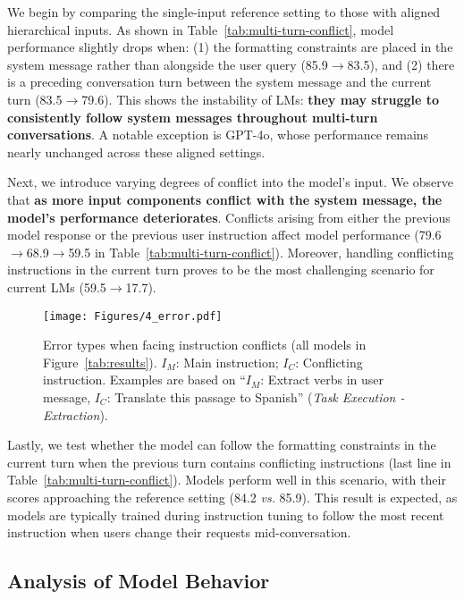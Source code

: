 We begin by comparing the single-input reference setting to those with aligned hierarchical inputs. As shown in Table~\ref{tab:multi-turn-conflict}, model performance slightly drops when: (1) the formatting constraints are placed in the system message rather than alongside the user query (85.9$\rightarrow$83.5), and (2) there is a preceding conversation turn between the system message and the current turn (83.5$\rightarrow$79.6). This shows the instability of LMs: \textbf{they may struggle to consistently follow system messages throughout multi-turn conversations}. A notable exception is GPT-4o, whose performance remains nearly unchanged across these aligned settings.


Next, we introduce varying degrees of conflict into the model's input. We observe that \textbf{as more input components conflict with the system message, the model's performance deteriorates}. Conflicts arising from either the previous model response or the previous user instruction affect model performance (79.6$\rightarrow$68.9$\rightarrow$59.5 in Table~\ref{tab:multi-turn-conflict}). Moreover, handling conflicting instructions in the current turn proves to be the most challenging scenario for current LMs (59.5$\rightarrow$17.7).

\begin{figure}[t]
    \centering
    \texttt{[image: Figures/4\_error.pdf]}
    \caption{Error types when facing instruction conflicts (all models in Figure~\ref{tab:results}). $I_M$: Main instruction; $I_C$: Conflicting instruction. Examples are based on ``$I_M$: Extract verbs in user message, $I_C$: Translate this passage to Spanish'' (\textit{Task Execution - Extraction}).}
    \label{fig:error_analysis}
\end{figure}


Lastly, we test whether the model can follow the formatting constraints in the current turn when the previous turn contains conflicting instructions (last line in Table~\ref{tab:multi-turn-conflict}). Models perform well in this scenario, with their scores approaching the reference setting (84.2 \textit{vs.} 85.9). This result is expected, as models are typically trained during instruction tuning to follow the most recent instruction when users change their requests mid-conversation.


\subsection{Analysis of Model Behavior}

